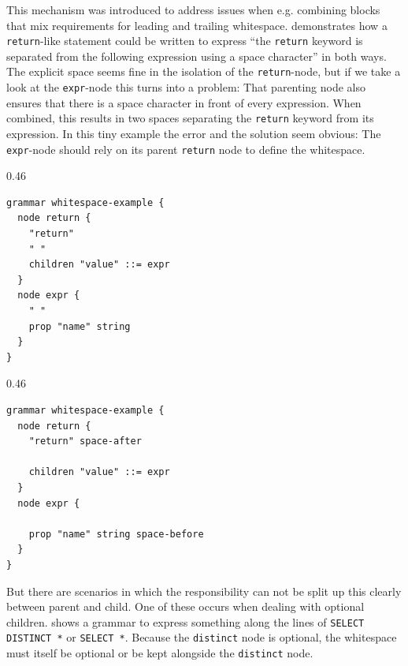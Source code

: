 \documentclass[]{report}
\begin{document}
This mechanism was introduced to address issues when e.g. combining blocks that mix requirements for leading and trailing whitespace.  demonstrates how a \texttt{return}-like statement could be written to express \enquote{the \texttt{return} keyword is separated from the following expression using a space character} in both ways. The explicit space seems fine in the isolation of the \texttt{return}-node, but if we take a look at the \texttt{expr}-node this turns into a problem: That parenting node also ensures that there is a space character in front of every expression. When combined, this results in two spaces separating the \texttt{return} keyword from its expression. In this tiny example the error and the solution seem obvious: The \texttt{expr}-node should rely on its parent \texttt{return} node to define the whitespace.

\begin{listing}[H]
\centering
\begin{sublisting}[t]{0.46\linewidth}
\begin{verbatim}
grammar whitespace-example {
  node return {
    "return"
    " "
    children "value" ::= expr
  }
  node expr {
    " "
    prop "name" string
  }
}
\end{verbatim}
  \caption{Results in \texttt{return␣␣var} (double spaces) }
\end{sublisting}%
\hfill
\begin{sublisting}[t]{0.46\linewidth}
\begin{verbatim}
grammar whitespace-example {
  node return {
    "return" space-after

    children "value" ::= expr
  }
  node expr {

    prop "name" string space-before
  }
}
\end{verbatim}
  \caption{Results \texttt{return␣var} }
\end{sublisting}%
  \label{lst:grammar-explicit-whitespace-return}
\end{listing}

But there are scenarios in which the responsibility can not be split up this clearly between parent and child. One of these occurs when dealing with optional children.  shows a grammar to express something along the lines of \texttt{SELECT DISTINCT *} or \texttt{SELECT *}. Because the \texttt{distinct} node is optional, the whitespace must itself be optional or be kept alongside the \texttt{distinct} node.
\end{document}
